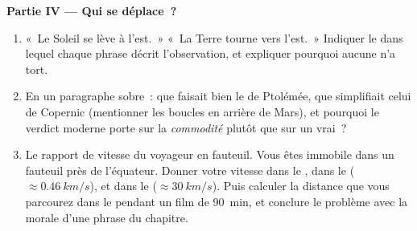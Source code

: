 \begin{problem}
\medskip
\noindent\textbf{Partie IV --- Qui se déplace~?}
\begin{enumerate}[resume]
  \item «~Le Soleil se lève à l'est.~» «~La Terre tourne vers
        l'est.~» Indiquer le  dans lequel chaque phrase
        décrit l'observation, et expliquer pourquoi aucune n'a tort.
  \item En un paragraphe sobre~: que faisait bien le  de
        Ptolémée, que simplifiait celui de Copernic (mentionner les
        boucles en arrière de Mars), et pourquoi le verdict moderne
        porte sur la \emph{commodité} plutôt que sur un 
        vrai~?
  \item Le rapport de vitesse du voyageur en fauteuil. Vous êtes
        immobile dans un fauteuil près de l'équateur. Donner votre
        vitesse dans le , dans le
         ($\approx \qty{0.46}{km/s}$), et
        dans le 
        ($\approx \qty{30}{km/s}$). Puis calculer la distance que vous
        parcourez dans le  pendant un
        film de \qty{90}{min}, et conclure le problème avec la morale
        d'une phrase du chapitre.
\end{enumerate}
\end{problem}
